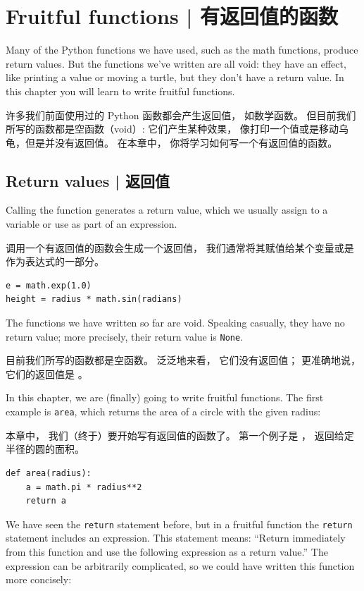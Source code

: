 

\chapter{Fruitful functions  |  有返回值的函数}
\label{fruitchap}

Many of the Python functions we have used, such as the math
functions, produce return values.  But the functions we've written
are all void: they have an effect, like printing a value
or moving a turtle, but they don't have a return value.  In
this chapter you will learn to write fruitful functions.

许多我们前面使用过的 Python 函数都会产生返回值， 如数学函数。
但目前我们所写的函数都是空函数（void）: 它们产生某种效果， 像打印一个值或是移动乌龟，但是并没有返回值。
在本章中， 你将学习如何写一个有返回值的函数。

\section{Return values  |  返回值}

Calling the function generates a return
value, which we usually assign to a variable or use as part of an
expression.

调用一个有返回值的函数会生成一个返回值， 我们通常将其赋值给某个变量或是作为表达式的一部分。

\begin{lstlisting}
e = math.exp(1.0)
height = radius * math.sin(radians)
\end{lstlisting}

%
The functions we have written so far are void.  Speaking casually,
they have no return value; more precisely,
their return value is {\tt None}.

目前我们所写的函数都是空函数。
泛泛地来看， 它们没有返回值； 更准确地说， 它们的返回值是  。

In this chapter, we are (finally) going to write fruitful functions.
The first example is {\tt area}, which returns the area of a circle
with the given radius:

本章中， 我们（终于）要开始写有返回值的函数了。
第一个例子是  ， 返回给定半径的圆的面积。

\begin{lstlisting}
def area(radius):
    a = math.pi * radius**2
    return a
\end{lstlisting}

%
We have seen the {\tt return} statement before, but in a fruitful
function the {\tt return} statement includes
an expression.  This statement means: ``Return immediately from
this function and use the following expression as a return value.''
The expression can be arbitrarily complicated, so we could
have written this function more concisely:

